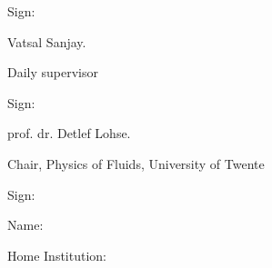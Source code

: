 \documentclass[a4paper,10pt]{article}
\begin{document}
\noindent
Sign: \hrulefill

\hspace*{0mm}\phantom{Sign: }Vatsal Sanjay.

\hspace*{0mm}\phantom{Sign: }Daily supervisor

\vspace{20mm}

\noindent
Sign: \hrulefill

\hspace*{0mm}\phantom{Sign: }prof. dr. Detlef Lohse.

\hspace*{0mm}\phantom{Sign: }Chair, Physics of Fluids, University of Twente

\vspace{20mm}
\noindent
Sign: \hrulefill

\hspace*{0mm}\phantom{Sign: }Name:

\hspace*{0mm}\phantom{Sign: }Home Institution:
\vspace{15mm}

\printbibliography
\end{document}
